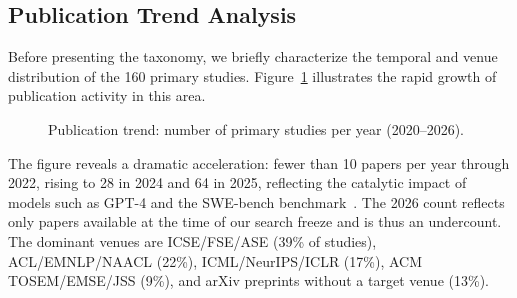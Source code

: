 \subsection{Publication Trend Analysis}

Before presenting the taxonomy, we briefly characterize the temporal and venue distribution
of the 160 primary studies. Figure~\ref{fig:pub-trend} illustrates the rapid growth of
publication activity in this area.

\begin{figure}[h]
\centering
{}
\caption{Publication trend: number of primary studies per year (2020--2026).}
\label{fig:pub-trend}
\end{figure}

The figure reveals a dramatic acceleration: fewer than 10 papers per year through 2022, rising
to 28 in 2024 and 64 in 2025, reflecting the catalytic impact of models such as GPT-4 and the
SWE-bench benchmark~\cite{jimenez2024swebench}. The 2026 count reflects only papers available
at the time of our search freeze and is thus an undercount. The dominant venues are ICSE/FSE/ASE
(39\% of studies), ACL/EMNLP/NAACL (22\%), ICML/NeurIPS/ICLR (17\%), ACM TOSEM/EMSE/JSS (9\%),
and arXiv preprints without a target venue (13\%).
